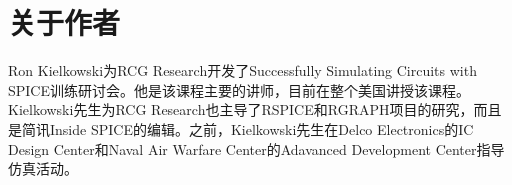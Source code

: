 \chapter*{关于作者}
Ron Kielkowski为RCG Research开发了Successfully Simulating Circuits with SPICE训练研讨会。他是该课程主要的讲师，目前在整个美国讲授该课程。Kielkowski先生为RCG Research也主导了RSPICE和RGRAPH项目的研究，而且是简讯Inside SPICE的编辑。之前，Kielkowski先生在Delco Electronics的IC Design Center和Naval Air Warfare Center的Adavanced Development Center指导仿真活动。